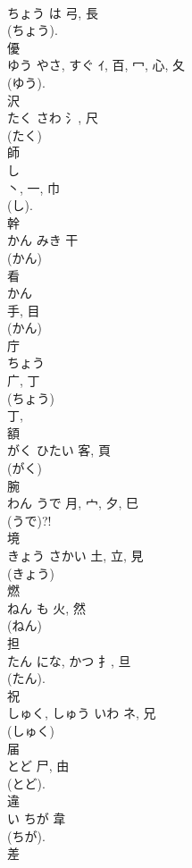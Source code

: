 \documentclass[8pt]{extreport}
\begin{document}
\begin{CJK}{UTF8}{min}
\\	ちょう	は	弓, 長	
\\	(ちょう). 
\\	優	
\\	ゆう	やさ, すぐ	ｲ, 百, 冖, 心, 夂	
\\	(ゆう). 
\\	沢	
\\	たく	さわ	氵, 尺	
\\	(たく) 
\\	師	
\\	し	
\\	丶, 一, 巾		
\\	(し). 
\\	幹	
\\	かん	みき	干	
\\	(かん) 
\\	看	
\\	かん	
\\	手, 目	
\\	(かん) 
\\	庁	
\\	ちょう	
\\	广, 丁	
\\	(ちょう) 
\\	丁, 
\\	額	
\\	がく	ひたい	客, 頁	
\\	(がく) 
\\	腕	
\\	わん	うで	月, 宀, 夕, 巳	
\\	(うで)?! 
\\	境	
\\	きょう	さかい	土, 立, 見	
\\	(きょう) 
\\	燃	
\\	ねん	も	火, 然	
\\	(ねん) 
\\	担	
\\	たん	にな, かつ	扌, 旦	
\\	(たん). 
\\	祝	
\\	しゅく, しゅう	いわ	ネ, 兄	
\\	(しゅく) 
\\	届	
\\	とど	尸, 由	
\\	(とど). 
\\	違	
\\	い	ちが	韋		
\\	(ちが). 
\\	差	

\end{CJK}
\end{document}
